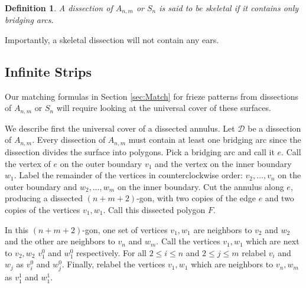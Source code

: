 \documentclass[12pt]{article}
\newtheorem{definition}{Definition}
\theoremstyle{remark}
\newcommand*{\D}{\mathcal{D}}
\begin{document}
\begin{definition}\label{def:SkeletalDissection}
A dissection of $A_{n,m}$ or $S_n$ is said to be \emph{skeletal} if it contains only bridging arcs.
\end{definition}

Importantly, a skeletal dissection will not contain any ears.

\subsection{Infinite Strips}\label{subsec:InfStrip}

Our matching formulas in Section \ref{sec:Match} for frieze patterns from dissections of $A_{n,m}$ or $S_n$ will require looking at the universal cover of these surfaces.

We describe first the universal cover of a dissected annulus. Let $\D$ be a dissection of $A_{n,m}$. Every dissection of $A_{n,m}$ must contain at least one bridging arc since the dissection divides the surface into polygons. Pick a bridging arc and call it $e$. Call the vertex of $e$ on the outer boundary $v_1$ and the vertex on the inner boundary $w_1$. Label the remainder of the vertices in counterclockwise order: $v_2,\ldots,v_n$ on the outer boundary and $w_2,\ldots,w_m$ on the inner boundary. Cut the annulus along $e$, producing a dissected $(n+m+2)$-gon, with two copies of the edge $e$ and two copies of the vertices $v_1,w_1$. Call this dissected polygon $F$.

In this $(n+m+2)$-gon, one set of vertices $v_1,w_1$ are neighbors to $v_2$ and $w_2$ and the other are neighbors to $v_n$ and $w_m$. Call the vertices $v_1,w_1$ which are next to $v_2,w_2$ $v_1^0$ and $w_1^0$ respectively. For all $2 \leq i \leq n$ and $2 \leq j \leq m$ relabel $v_i$ and $w_j$ as $v_i^0$ and $w_j^0$. Finally, relabel the vertices $v_1,w_1$ which are neighbors to $v_n,w_m$ as $v_1^1$ and $w_1^1$. 
\end{document}

